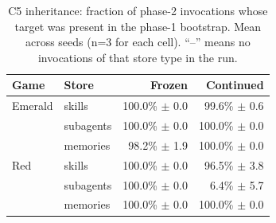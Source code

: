\begin{table}[t]
\centering
\small
\caption{C5 inheritance: fraction of phase-2 invocations whose target was present in the phase-1 bootstrap. Mean across seeds (n=3 for each cell). ``--'' means no invocations of that store type in the run.}
\label{tab:c5_inheritance}
\begin{tabular}{llrr}
\toprule
Game & Store & Frozen & Continued \\
\midrule
Emerald & skills & 100.0\% $\pm$ 0.0 & 99.6\% $\pm$ 0.6 \\
 & subagents & 100.0\% $\pm$ 0.0 & 100.0\% $\pm$ 0.0 \\
 & memories & 98.2\% $\pm$ 1.9 & 100.0\% $\pm$ 0.0 \\
\midrule
Red & skills & 100.0\% $\pm$ 0.0 & 96.5\% $\pm$ 3.8 \\
 & subagents & 100.0\% $\pm$ 0.0 & 6.4\% $\pm$ 5.7 \\
 & memories & 100.0\% $\pm$ 0.0 & 100.0\% $\pm$ 0.0 \\
\bottomrule
\end{tabular}
\end{table}
